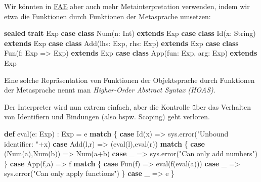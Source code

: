 \documentclass[]{article}
\newenvironment{Shaded}{}{}
\newcommand{\FunctionTok}[1]{\textcolor[rgb]{0.02,0.16,0.49}{#1}}
\newcommand{\KeywordTok}[1]{\textcolor[rgb]{0.00,0.44,0.13}{\textbf{#1}}}
\newcommand{\NormalTok}[1]{#1}
\newcommand{\StringTok}[1]{\textcolor[rgb]{0.25,0.44,0.63}{#1}}
\begin{document}
Wir könnten in \protect\hyperlink{higher-order-funktionen-fae}{FAE} aber
auch mehr Metainterpretation verwenden, indem wir etwa die Funktionen
durch Funktionen der Metasprache umsetzen:

\begin{Shaded}
\begin{Highlighting}[]
\KeywordTok{sealed} \KeywordTok{trait}\NormalTok{ Exp}
\KeywordTok{case} \KeywordTok{class} \FunctionTok{Num}\NormalTok{(n: Int) }\KeywordTok{extends}\NormalTok{ Exp}
\KeywordTok{case} \KeywordTok{class} \FunctionTok{Id}\NormalTok{(x: String) }\KeywordTok{extends}\NormalTok{ Exp}
\KeywordTok{case} \KeywordTok{class} \FunctionTok{Add}\NormalTok{(lhs: Exp, rhs: Exp) }\KeywordTok{extends}\NormalTok{ Exp}
\KeywordTok{case} \KeywordTok{class} \FunctionTok{Fun}\NormalTok{(f: Exp =\textgreater{} Exp) }\KeywordTok{extends}\NormalTok{ Exp }
\KeywordTok{case} \KeywordTok{class} \FunctionTok{App}\NormalTok{(fun: Exp, arg: Exp) }\KeywordTok{extends}\NormalTok{ Exp}
\end{Highlighting}
\end{Shaded}

Eine solche Repräsentation von Funktionen der Objektsprache durch
Funktionen der Metasprache nennt man \emph{Higher-Order Abstract Syntax
(HOAS)}.

Der Interpreter wird nun extrem einfach, aber die Kontrolle über das
Verhalten von Identifiern und Bindungen (also bspw. Scoping) geht
verloren.

\begin{Shaded}
\begin{Highlighting}[]
\KeywordTok{def} \FunctionTok{eval}\NormalTok{(e: Exp) : Exp = e }\KeywordTok{match}\NormalTok{ \{}
  \KeywordTok{case} \FunctionTok{Id}\NormalTok{(x) =\textgreater{} sys.}\FunctionTok{error}\NormalTok{(}\StringTok{"Unbound identifier: "}\NormalTok{+x)}
  \KeywordTok{case} \FunctionTok{Add}\NormalTok{(l,r) =\textgreater{} (}\FunctionTok{eval}\NormalTok{(l),}\FunctionTok{eval}\NormalTok{(r)) }\KeywordTok{match}\NormalTok{ \{}
    \KeywordTok{case}\NormalTok{ (}\FunctionTok{Num}\NormalTok{(a),}\FunctionTok{Num}\NormalTok{(b)) =\textgreater{} }\FunctionTok{Num}\NormalTok{(a+b)}
    \KeywordTok{case}\NormalTok{ \_ =\textgreater{} sys.}\FunctionTok{error}\NormalTok{(}\StringTok{"Can only add numbers"}\NormalTok{)}
\NormalTok{  \}}
  \KeywordTok{case} \FunctionTok{App}\NormalTok{(f,a) =\textgreater{} f }\KeywordTok{match}\NormalTok{ \{}
    \KeywordTok{case} \FunctionTok{Fun}\NormalTok{(f) =\textgreater{} }\FunctionTok{eval}\NormalTok{(}\FunctionTok{f}\NormalTok{(}\FunctionTok{eval}\NormalTok{(a)))}
    \KeywordTok{case}\NormalTok{ \_ =\textgreater{} sys.}\FunctionTok{error}\NormalTok{(}\StringTok{"Can only apply functions"}\NormalTok{)}
\NormalTok{  \}}
  \KeywordTok{case}\NormalTok{ \_ =\textgreater{} e}
\NormalTok{\}}
\end{Highlighting}
\end{Shaded}
\end{document}
